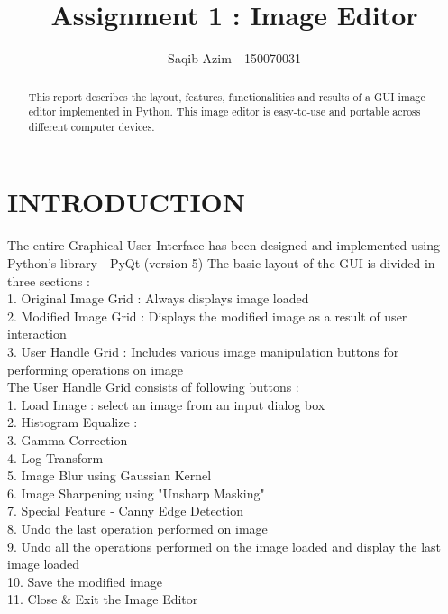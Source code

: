 \documentclass[letterpaper, 10 pt, conference]{ieeeconf}  %
\title{\LARGE \bf
Assignment 1 : Image Editor 
}
\author{Saqib Azim - 150070031%
}
\begin{document}
\maketitle
\thispagestyle{empty}
\pagestyle{empty}

\begin{abstract}

This report describes the layout, features, functionalities and results of a GUI image editor implemented in Python. This image editor is easy-to-use and portable across different computer devices.
\end{abstract}

\section{\textbf{INTRODUCTION}}
The entire Graphical User Interface has been designed and implemented using Python's library - PyQt (version 5)
The basic layout of the GUI is divided in three sections : \\
1. Original Image Grid : Always displays image loaded \\
2. Modified Image Grid : Displays the modified image as a result of user interaction  \\
3. User Handle Grid : Includes various image manipulation buttons for performing operations on image \\

The User Handle Grid consists of following buttons : \\
1. Load Image : select an image from an input dialog box \\
2. Histogram Equalize : \\
3. Gamma Correction  \\
4. Log Transform  \\
5. Image Blur using Gaussian Kernel  \\ 
6. Image Sharpening using "Unsharp Masking"  \\
7. Special Feature - Canny Edge Detection   \\
8. Undo the last operation performed on image  \\
9. Undo all the operations performed on the image loaded and display the last image loaded \\
10. Save the modified image  \\
11. Close \& Exit the Image Editor  \\
\end{document}

